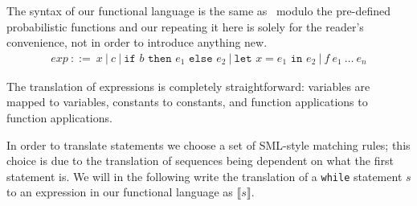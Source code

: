 \documentclass[11pt, leqno, titlepage]{article}
\theoremstyle{definition}
\begin{document}
The syntax of our functional language is the same as \rml\ modulo the pre-defined
probabilistic functions and our repeating it here is solely for the reader's
convenience, not in order to introduce anything new. 
\begin{align*}
  exp~::= ~ x~\vert ~ c~\vert ~ \texttt{if }b\texttt{ then }e_1\texttt{ else } e_2~
  \vert ~ \texttt{let }x = e_1 \texttt{ in }e_2~\vert ~ f~e_1~\dots~e_n
\end{align*}


The translation of expressions is completely straightforward: variables are mapped to
variables, constants to constants, and function applications to function
applications.

In order to translate statements we choose a set of SML-style matching rules; this
choice is due to the translation of sequences being dependent on what the first
statement is. We will in the following write the translation of a \texttt{while}
statement $s$ to an expression in our functional language as $\llbracket s
\rrbracket$. 
\end{document}
